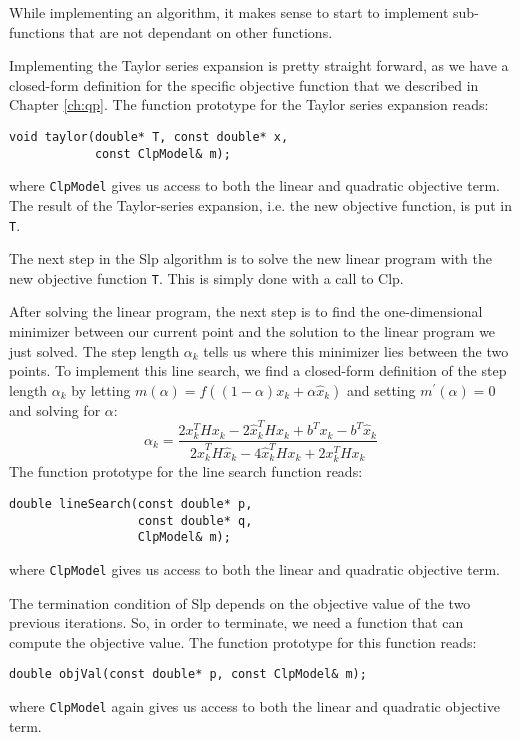While implementing an algorithm, it makes sense to start to implement
sub-functions that are not dependant on other functions. 

Implementing the Taylor series expansion is pretty straight forward, as
we have a closed-form definition for the specific objective function that
we described in Chapter \ref{ch:qp}. The function prototype for the
Taylor series expansion reads:
\begin{verbatim}
void taylor(double* T, const double* x,
            const ClpModel& m);
\end{verbatim}
where \texttt{ClpModel} gives us access to both the linear and quadratic
objective term. The result of the Taylor-series expansion, i.e. the new
objective function, is put in \texttt{T}.

The next step in the Slp algorithm is to solve the new linear program with the
new objective function \texttt{T}. This is simply done with a call to Clp.

After solving the linear program, the next step is to find the one-dimensional
minimizer between our current point and the solution to the linear program we
just solved.
The step length $\alpha_k$ tells us where this minimizer lies between the two
points.
To implement this line search, we find a closed-form definition of the step
length $\alpha_k$ by letting $m(\alpha) = f((1-\alpha) x_k + \alpha \hat{x}_k)$
and setting $m^\prime(\alpha) = 0$ and solving for $\alpha$:
\[
\alpha_k = \frac{
                2x_k^T H x_k
                - 2\hat{x}_k^T H x_k
                + b^T x_k - b^T \hat{x}_k
                }{
                  2\hat{x}_k^T H \hat{x}_k
                - 4\hat{x}_k^T H x_k
                + 2x_k^T H x_k
                }
\]
The function prototype for the line search function reads:
\begin{verbatim}
double lineSearch(const double* p,
                  const double* q,
                  ClpModel& m);
\end{verbatim}
where \texttt{ClpModel} gives us access to both the linear and quadratic
objective term.

The termination condition of Slp depends on the objective value of the two
previous iterations. So, in order to terminate, we need a function that can
compute the objective value. The function prototype for this function reads:
\begin{verbatim}
double objVal(const double* p, const ClpModel& m);
\end{verbatim}
where \texttt{ClpModel} again gives us access to both the linear and quadratic
objective term.

